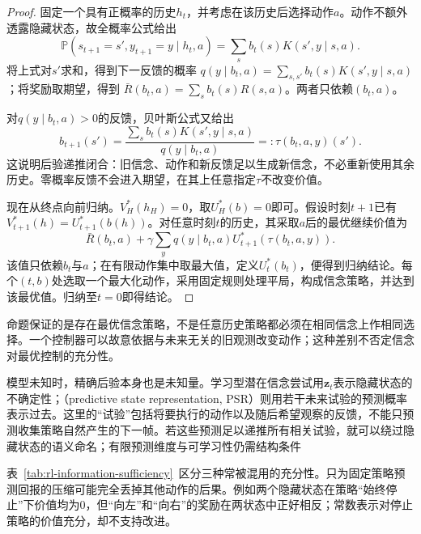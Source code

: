 \begin{proof}
  固定一个具有正概率的历史$h_t$，并考虑在该历史后选择动作$a$。动作不额外透露隐藏状态，故全概率公式给出
  \[
    \mathbb P(s_{t+1}=s',y_{t+1}=y\mid h_t,a)
    =\sum_s b_t(s)K(s',y\mid s,a).
  \]
  将上式对$s'$求和，得到下一反馈的概率
  $q(y\mid b_t,a)=\sum_{s,s'}b_t(s)K(s',y\mid s,a)$；将奖励取期望，得到
  $\bar R(b_t,a)=\sum_s b_t(s)R(s,a)$。两者只依赖$(b_t,a)$。

  对$q(y\mid b_t,a)>0$的反馈，贝叶斯公式又给出
  \[
    b_{t+1}(s')
    =\frac{\sum_s b_t(s)K(s',y\mid s,a)}
           {q(y\mid b_t,a)}
    =:\tau(b_t,a,y)(s').
  \]
  这说明后验递推闭合：旧信念、动作和新反馈足以生成新信念，不必重新使用其余历史。零概率反馈不会进入期望，在其上任意指定$\tau$不改变价值。

  现在从终点向前归纳。$V_H^*(h_H)=0$，取$U_H^*(b)=0$即可。假设时刻$t+1$已有$V_{t+1}^*(h)=U_{t+1}^*(b(h))$。对任意时刻$t$的历史，其采取$a$后的最优继续价值为
  \[
    \bar R(b_t,a)
    +\gamma\sum_y q(y\mid b_t,a)
                      U_{t+1}^*(\tau(b_t,a,y)).
  \]
  该值只依赖$b_t$与$a$；在有限动作集中取最大值，定义$U_t^*(b_t)$，便得到归纳结论。每个$(t,b)$处选取一个最大化动作，采用固定规则处理平局，构成信念策略，并达到该最优值。归纳至$t=0$即得结论。
\end{proof}

命题保证的是存在最优信念策略，不是任意历史策略都必须在相同信念上作相同选择。一个控制器可以故意依据与未来无关的旧观测改变动作；这种差别不否定信念对最优控制的充分性。

模型未知时，精确后验本身也是未知量。学习型潜在信念尝试用$\bm z_t$表示隐藏状态的不确定性；（predictive state representation, PSR）则用若干未来试验的预测概率表示过去。这里的“试验”包括将要执行的动作以及随后希望观察的反馈，不能只预测收集策略自然产生的下一帧。若这些预测足以递推所有相关试验，就可以绕过隐藏状态的语义命名；有限预测维度与可学习性仍需结构条件

表~\ref{tab:rl-information-sufficiency}~区分三种常被混用的充分性。只为固定策略预测回报的压缩可能完全丢掉其他动作的后果。例如两个隐藏状态在策略“始终停止”下价值均为0，但“向左”和“向右”的奖励在两状态中正好相反；常数表示对停止策略的价值充分，却不支持改进。

